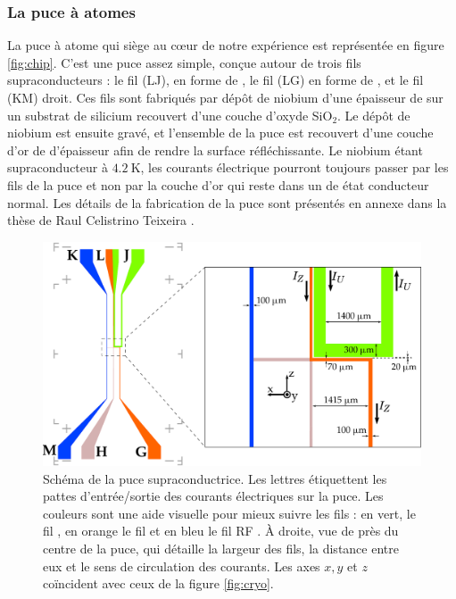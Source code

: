 \subsubsection*{La puce à atomes}
\noindent La puce à atome qui siège au c\oe ur de notre expérience est représentée en figure \eqref{fig:chip}.
C'est une puce assez simple, conçue autour de trois fils supraconducteurs : le fil (LJ), en forme de , le fil (LG) en forme de , et le fil (KM) droit.
Ces fils sont fabriqués par dépôt de niobium d'une épaisseur de  sur un substrat de silicium recouvert d'une couche d'oxyde SiO$_2$.
Le dépôt de niobium est ensuite gravé, et l'ensemble de la puce est recouvert d'une couche d'or de  d'épaisseur afin de rendre la surface réfléchissante.
Le niobium étant supraconducteur à $\SI{4.2}{\K}$, les courants électrique pourront toujours passer par les fils de la puce et non par la couche d'or qui reste dans un de état conducteur normal.
Les détails de la fabrication de la puce sont présentés en annexe dans la thèse de Raul Celistrino Teixeira \cite{PHD_CELISTRINO}.
%
\begin{figure}[!h]
\centering
\includegraphics[width=\linewidth]{figures/setup/coldatoms/chip}
\caption[Schéma de la puce à atomes supraconductrice]{Schéma de la puce supraconductrice.
Les lettres étiquettent les pattes d'entrée/sortie des courants électriques sur la puce.
Les couleurs sont une aide visuelle pour mieux suivre les fils : en vert, le \og fil \fg{}, en orange le \og fil \fg{} et en bleu le \og fil RF \fg{}.
\`A droite, vue de près du centre de la puce, qui détaille la largeur des fils, la distance entre eux et le sens de circulation des courants.
Les axes $x,y$ et $z$ coïncident avec ceux de la figure \eqref{fig:cryo}.
}
\label{fig:chip}
\end{figure}
%


